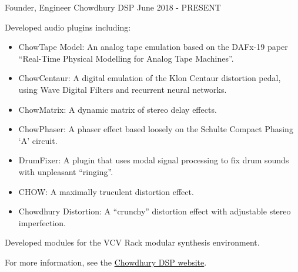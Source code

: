 

\begin{cventries}

    \cventry
    {Founder, Engineer} %
    {Chowdhury DSP} %
    {} %
    {June 2018 - PRESENT} %
    {
      \begin{cvitems} %
        \item {Developed audio plugins including:}
        \begin{itemize}
            \item {ChowTape Model: An analog tape emulation based on the DAFx-19 paper ``Real-Time Physical Modelling for Analog Tape Machines''.}
            \item {ChowCentaur: A digital emulation of the Klon Centaur distortion pedal, using Wave Digital Filters and recurrent neural networks.}
            \item {ChowMatrix: A dynamic matrix of stereo delay effects.}
            \item {ChowPhaser: A phaser effect based loosely on the Schulte Compact Phasing `A' circuit.}
            \item {DrumFixer: A plugin that uses modal signal processing to fix drum sounds with unpleasant ``ringing''.}
            \item {CHOW: A maximally truculent distortion effect.}
            \item {Chowdhury Distortion: A ``crunchy'' distortion effect with adjustable stereo imperfection.}
        \end{itemize}
        \item {Developed modules for the VCV Rack modular synthesis environment.}
        \item {For more information, see the \href{https://ccrma.stanford.edu/~jatin/chowdsp}{Chowdhury DSP website}.}
      \end{cvitems}
    }


\end{cventries}
